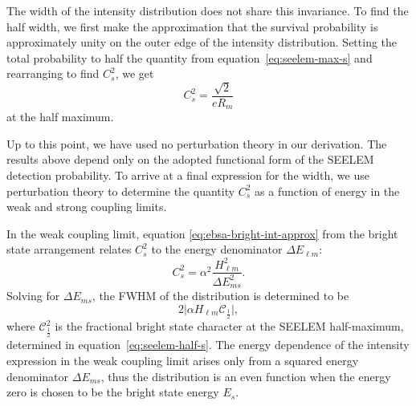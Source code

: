 \documentclass[12pt]{mitthesis}
\begin{document}
The width of the intensity distribution does not share this
invariance.  To find the half width, we first make the approximation
that the survival probability is approximately unity on the outer edge
of the intensity distribution. Setting the total probability to half
the quantity from equation~\ref{eq:seelem-max-s} and rearranging to
find $C_s^2$, we get
\begin{equation}
  \label{eq:seelem-half-s}
  C_s^2 = \frac{\sqrt{2}}{e R_m} 
\end{equation}
at the half maximum.

Up to this point, we have used no perturbation theory in our
derivation. The results above depend only on the adopted functional
form of the SEELEM detection probability.  To arrive at a final
expression for the width, we use perturbation theory to determine the
quantity $C_s^2$ as a function of energy in the weak and strong
coupling limits.

In the weak coupling limit, equation \ref{eq:ebsa-bright-int-approx}
from the bright state arrangement relates $C_s^2$ to the energy
denominator $\Delta E_{\ell m}$:
\begin{equation}
  C_s^2 = \alpha^2 \frac{H_{\ell m}^2}{\Delta E_{ms}^2}.
\end{equation}
Solving for $\Delta E_{ms}$, the FWHM of the distribution
is determined to be
\begin{equation}
  \label{eq:seelem-weak-fwhm}
  2 \lvert \alpha H_{\ell m} \mathcal{C}_{\frac{1}{2}}\rvert,
\end{equation}
where $\mathcal{C}_{\frac{1}{2}}^2$ is the fractional bright state
character at the SEELEM half-maximum, determined in
equation~\ref{eq:seelem-half-s}.  The energy dependence of the
intensity expression in the weak coupling limit arises only from a
squared energy denominator $\Delta E_{ms}$, thus the distribution is
an even function when the energy zero is chosen to be the bright state
energy $E_s$.
\end{document}
